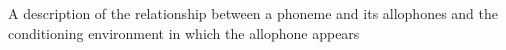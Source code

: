 A description of the relationship between a phoneme and its allophones and the conditioning environment in which the allophone appears
